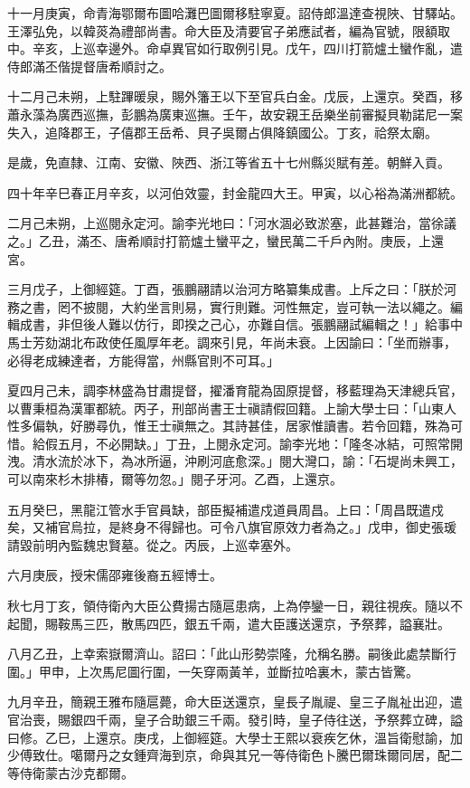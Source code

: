 \begin{pinyinscope}
十一月庚寅，命青海鄂爾布圖哈灘巴圖爾移駐寧夏。詔侍郎溫達查視陜、甘驛站。王澤弘免，以韓菼為禮部尚書。命大臣及清要官子弟應試者，編為官號，限額取中。辛亥，上巡幸邊外。命卓異官如行取例引見。戊午，四川打箭爐土蠻作亂，遣侍郎滿丕偕提督唐希順討之。

十二月己未朔，上駐蹕暖泉，賜外籓王以下至官兵白金。戊辰，上還京。癸酉，移蕭永藻為廣西巡撫，彭鵬為廣東巡撫。壬午，故安親王岳樂坐前審擬貝勒諾尼一案失入，追降郡王，子僖郡王岳希、貝子吳爾占俱降鎮國公。丁亥，祫祭太廟。

是歲，免直隸、江南、安徽、陜西、浙江等省五十七州縣災賦有差。朝鮮入貢。

四十年辛巳春正月辛亥，以河伯效靈，封金龍四大王。甲寅，以心裕為滿洲都統。

二月己未朔，上巡閱永定河。諭李光地曰：「河水涸必致淤塞，此甚難治，當徐議之。」乙丑，滿丕、唐希順討打箭爐土蠻平之，蠻民萬二千戶內附。庚辰，上還宮。

三月戊子，上御經筵。丁酉，張鵬翮請以治河方略纂集成書。上斥之曰：「朕於河務之書，罔不披閱，大約坐言則易，實行則難。河性無定，豈可執一法以繩之。編輯成書，非但後人難以仿行，即揆之己心，亦難自信。張鵬翮試編輯之！」給事中馬士芳劾湖北布政使任風厚年老。調來引見，年尚未衰。上因諭曰：「坐而辦事，必得老成練達者，方能得當，州縣官則不可耳。」

夏四月己未，調李林盛為甘肅提督，擢潘育龍為固原提督，移藍理為天津總兵官，以曹秉桓為漢軍都統。丙子，刑部尚書王士禛請假回籍。上諭大學士曰：「山東人性多偏執，好勝尋仇，惟王士禛無之。其詩甚佳，居家惟讀書。若令回籍，殊為可惜。給假五月，不必開缺。」丁丑，上閱永定河。諭李光地：「隆冬冰結，可照常開洩。清水流於冰下，為冰所逼，沖刷河底愈深。」閱大灣口，諭：「石堤尚未興工，可以南來杉木排椿，爾等勿忽。」閱子牙河。乙酉，上還京。

五月癸巳，黑龍江管水手官員缺，部臣擬補遣戍道員周昌。上曰：「周昌既遣戍矣，又補官烏拉，是終身不得歸也。可令八旗官原效力者為之。」戊申，御史張瑗請毀前明內監魏忠賢墓。從之。丙辰，上巡幸塞外。

六月庚辰，授宋儒邵雍後裔五經博士。

秋七月丁亥，領侍衛內大臣公費揚古隨扈患病，上為停鑾一日，親往視疾。隨以不起聞，賜鞍馬三匹，散馬四匹，銀五千兩，遣大臣護送還京，予祭葬，謚襄壯。

八月乙丑，上幸索嶽爾濟山。詔曰：「此山形勢崇隆，允稱名勝。嗣後此處禁斷行圍。」甲申，上次馬尼圖行圍，一矢穿兩黃羊，並斷拉哈裏木，蒙古皆驚。

九月辛丑，簡親王雅布隨扈薨，命大臣送還京，皇長子胤禔、皇三子胤祉出迎，遣官治喪，賜銀四千兩，皇子合助銀三千兩。發引時，皇子侍往送，予祭葬立碑，謚曰修。乙巳，上還京。庚戌，上御經筵。大學士王熙以衰疾乞休，溫旨衛慰諭，加少傅致仕。噶爾丹之女鍾齊海到京，命與其兄一等侍衛色卜騰巴爾珠爾同居，配二等侍衛蒙古沙克都爾。


\end{pinyinscope}
